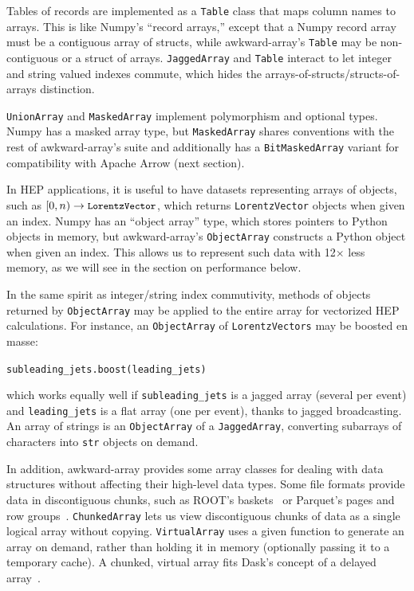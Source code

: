 \documentclass{webofc}
\begin{document}
Tables of records are implemented as a {\tt\small Table} class that maps column names to arrays. This is like Numpy's ``record arrays,'' except that a Numpy record array must be a contiguous array of structs, while awkward-array's {\tt\small Table} may be non-contiguous or a struct of arrays. {\tt\small JaggedArray} and {\tt\small Table} interact to let integer and string valued indexes commute, which hides the arrays-of-structs/structs-of-arrays distinction.

{\tt\small UnionArray} and {\tt\small MaskedArray} implement polymorphism and optional types. Numpy has a masked array type, but {\tt\small MaskedArray} shares conventions with the rest of awkward-array's suite and additionally has a {\tt\small BitMaskedArray} variant for compatibility with Apache Arrow (next section).

In HEP applications, it is useful to have datasets representing arrays of objects, such as $[0, n) \to \mbox{\tt\small LorentzVector}$, which returns \mbox{\tt\small LorentzVector} objects when given an index. Numpy has an ``object array'' type, which stores pointers to Python objects in memory, but awkward-array's {\tt\small ObjectArray} constructs a Python object when given an index. This allows us to represent such data with 12$\times$ less memory, as we will see in the section on performance below.

In the same spirit as integer/string index commutivity, methods of objects returned by {\tt\small ObjectArray} may be applied to the entire array for vectorized HEP calculations. For instance, an {\tt\small ObjectArray} of \mbox{\tt\small LorentzVectors} may be boosted en masse:

\begin{center}
\tt\small subleading\_jets.boost(leading\_jets)
\end{center}

\noindent which works equally well if {\tt\small subleading\_jets} is a jagged array (several per event) and {\tt\small leading\_jets} is a flat array (one per event), thanks to jagged broadcasting. An array of strings is an {\tt\small ObjectArray} of a {\tt\small JaggedArray}, converting subarrays of characters into {\tt\small str} objects on demand.

In addition, awkward-array provides some array classes for dealing with data structures without affecting their high-level data types. Some file formats provide data in discontiguous chunks, such as ROOT's baskets~\cite{root-file} or Parquet's pages and row groups~\cite{parquet-file}. {\tt\small ChunkedArray} lets us view discontiguous chunks of data as a single logical array without copying. {\tt\small VirtualArray} uses a given function to generate an array on demand, rather than holding it in memory (optionally passing it to a temporary cache). A chunked, virtual array fits Dask's concept of a delayed array~\cite{dask}.
\end{document}
